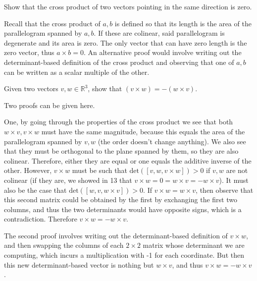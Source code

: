 \begin{exercise}{13}
    Show that the cross product of two vectors pointing in the same direction is zero.
\end{exercise}

\begin{solution}

    Recall that the cross product of $a, b$ is defined so that its length is the area of the parallelogram spanned by $a, b$. If these are colinear, said parallelogram is degenerate and its area is zero. The only vector that can have zero length is the zero vector, thus $a \times b = 0$. An alternative proof would involve writing out the determinant-based definition of the cross product and observing that one of $a, b$ can be written as a scalar multiple of the other.
\end{solution}

\begin{exercise}{15}
    Given two vectors $v, w \in \mathbb{R}^3$, show that $(v \times w) = -(w \times v)$.
\end{exercise}

\begin{solution}

    Two proofs can be given here. 
    
    One, by going through the properties of the cross product we see that both $w \times v, v \times w$ must have the same magnitude, because this equals the area of the parallelogram spanned by $v, w$ (the order doesn't change anything). We also see that they must be orthogonal to the plane spanned by them, so they are also colinear. Therefore, either they are equal or one equals the additive inverse of the other. However, $v \times w$ must be such that $\text{det}([v, w, v \times w]) > 0$ if $v, w$ are not colinear (if they are, we showed in 13 that $v \times w = 0 = w \times v = - w \times v$). It must also be the case that $\text{det}([w, v, w \times v]) > 0$. If $v \times w = w \times v$, then observe that this second matrix could be obtained by the first by exchanging the first two columns, and thus the two determinants would have opposite signs, which is a contradiction. Therefore $v \times w = - w \times v$.

    The second proof involves writing out the determinant-based definition of $v \times w$, and then swapping the columns of each $2 \times 2$ matrix whose determinant we are computing, which incurs a multiplication with -1 for each coordinate. But then this new determinant-based vector is nothing but $w \times v$, and thus $v \times w = - w \times v$.
\end{solution}

